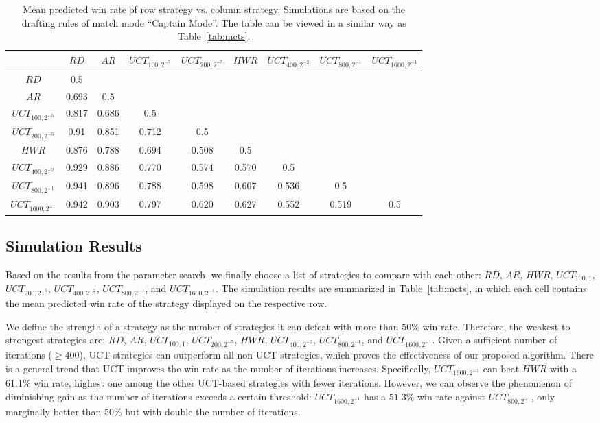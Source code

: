 \begin{table}
  \caption{Mean predicted win rate of row strategy  vs. column strategy. Simulations are based on the drafting rules of match mode ``Captain Mode''. The table can be viewed in a similar way as Table~\ref{tab:mcts}.}
  \label{tab:mcts_captain_mode}
  \centering
  \begin{tabular}{ccccccccc}
    \toprule
      & $RD$ & $AR$ & $UCT_{100, 2^{-5}}$ & $UCT_{200, 2^{-5}}$ & $HWR$  & $UCT_{400, 2^{-2}}$ & $UCT_{800, 2^{-1}}$ & $UCT_{1600, 2^{-1}}$ \\
    \midrule
    $RD$ & 0.5 &  &  &  &  &  &  &  \\
    $AR$ & 0.693 & 0.5 &  &  &  &  &  & \\
    $UCT_{100, 2^{-5}}$ & 0.817 & 0.686 & 0.5 & & &  &  \\
    $UCT_{200, 2^{-5}}$ & 0.91 & 0.851 & 0.712 & 0.5 & & & \\
    $HWR$ & 0.876 & 0.788 & 0.694  & 0.508 & 0.5 \\
    $UCT_{400, 2^{-2}}$ & 0.929 & 0.886 & 0.770 & 0.574 & 0.570 &  0.5  \\
    $UCT_{800, 2^{-1}}$ & 0.941 & 0.896 & 0.788 & 0.598 & 0.607 & 0.536 & 0.5 &  \\
$UCT_{1600, 2^{-1}}$ & 0.942 & 0.903 & 0.797 & 0.620 & 0.627 & 0.552 & 0.519 &  0.5 \\
  \bottomrule
\end{tabular}
\end{table}


\subsection{Simulation Results}
Based on the results from the parameter search, we finally choose a list of strategies to compare with each other: $RD$, $AR$, $HWR$, $UCT_{100, 1}$, $UCT_{200, 2^{-5}}$, $UCT_{400, 2^{-2}}$, $UCT_{800, 2^{-1}}$, and $UCT_{1600, 2^{-1}}$. The simulation results are summarized in Table~\ref{tab:mcts}, in which each cell contains the mean predicted win rate of the strategy displayed on the respective row. 

We define the strength of a strategy as the number of strategies it can defeat with more than $50\%$ win rate. Therefore, the weakest to strongest strategies are: $RD$, $AR$, $UCT_{100, 1}$, $UCT_{200, 2^{-5}}$, $HWR$, $UCT_{400, 2^{-2}}$, $UCT_{800, 2^{-1}}$, and $UCT_{1600, 2^{-1}}$. Given a sufficient number of iterations ($\geq400$), UCT strategies can outperform all non-UCT strategies, which proves the effectiveness of our proposed algorithm. There is a general trend that UCT improves the win rate as the number of iterations increases. Specifically, $UCT_{1600, 2^{-1}}$ can beat $HWR$ with a 61.1\% win rate, highest one among the other UCT-based strategies with fewer iterations. However, we can observe the phenomenon of diminishing gain as the number of iterations exceeds a certain threshold: $UCT_{1600, 2^{-1}}$ has a $51.3\%$ win rate against $UCT_{800, 2^{-1}}$, only marginally better than $50\%$ but with double the number of iterations.

